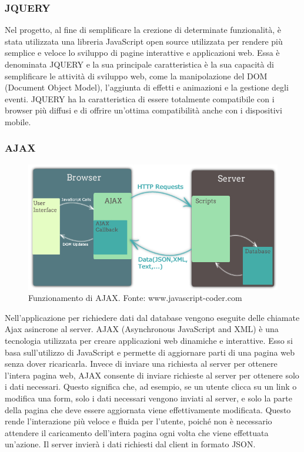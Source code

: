 \documentclass[a4paper,final,12pt]{report}
\begin{document}
\subsubsection{JQUERY}
Nel progetto, al fine di semplificare la crezione di determinate funzionalità, è stata utilizzata una libreria JavaScript open source utilizzata per rendere più semplice e veloce lo sviluppo di pagine interattive e applicazioni web. Essa è denominata JQUERY e la sua principale caratteristica è la sua capacità di semplificare le attività di sviluppo web, come la manipolazione del DOM (Document Object Model), l'aggiunta di effetti e animazioni e la gestione degli eventi. JQUERY ha la caratteristica di essere totalmente compatibile con i browser più diffusi e di offrire un'ottima compatibilità anche con i dispositivi mobile.
\subsubsection{AJAX}
\begin{figure}[hbtp]
\centering
\includegraphics[scale=0.40]{img_concettuale/ajax.jpg}
\caption{Funzionamento di AJAX. Fonte: www.javascript-coder.com}
\end{figure} 
Nell'applicazione per richiedere dati dal database vengono eseguite delle chiamate Ajax asincrone al server. AJAX (Asynchronous JavaScript and XML) è una tecnologia utilizzata per creare applicazioni web dinamiche e interattive. Esso si basa sull'utilizzo di JavaScript e permette di aggiornare parti di una pagina web senza dover ricaricarla.
Invece di inviare una richiesta al server per ottenere l'intera pagina web, AJAX consente di inviare richieste al server per ottenere solo i dati necessari. Questo significa che, ad esempio, se un utente clicca su un link o modifica una form, solo i dati necessari vengono inviati al server, e solo la parte della pagina che deve essere aggiornata viene effettivamente modificata. Questo rende l'interazione più veloce e fluida per l'utente, poiché non è necessario attendere il caricamento dell'intera pagina ogni volta che viene effettuata un'azione.
Il server invierà i dati richiesti dal client in formato JSON.
\end{document}
